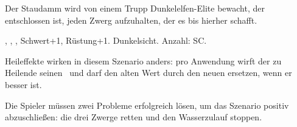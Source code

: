 {		Der Staudamm wird von einem Trupp Dunkelelfen-Elite bewacht, der entschlossen ist, jeden Zwerg aufzuhalten, der es bis hierher schafft.

		 , , , Schwert+1, Rüstung+1. Dunkelsicht. Anzahl: SC.


		\noindent
		Heileffekte wirken in diesem Szenario anders: pro Anwendung wirft der zu Heilende seinen \HD\ und darf den alten Wert durch den neuen ersetzen, wenn er besser ist.


		\noindent
		Die Spieler müssen zwei Probleme erfolgreich lösen, um das Szenario positiv abzuschließen: die drei Zwerge retten und den Wasserzulauf stoppen.
}
